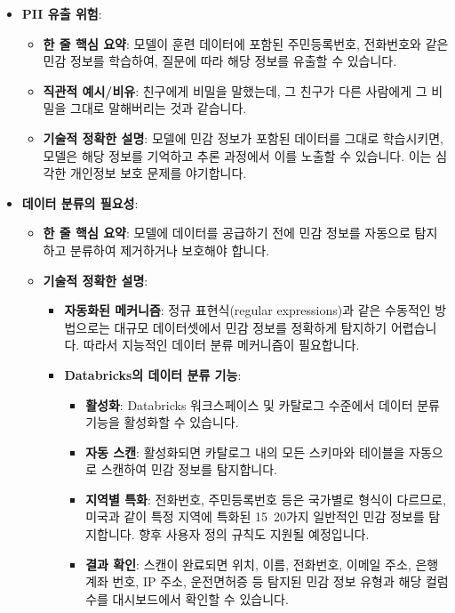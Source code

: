 \documentclass[11pt,a4paper]{article}
\theoremstyle{definition}
\begin{document}
\begin{itemize}
\begin{itemize}
\begin{itemize}
\begin{itemize}
    \item \textbf{PII 유출 위험}:
    \begin{itemize}
        \item \textbf{한 줄 핵심 요약}: 모델이 훈련 데이터에 포함된 주민등록번호, 전화번호와 같은 민감 정보를 학습하여, 질문에 따라 해당 정보를 유출할 수 있습니다.
        \item \textbf{직관적 예시/비유}: 친구에게 비밀을 말했는데, 그 친구가 다른 사람에게 그 비밀을 그대로 말해버리는 것과 같습니다.
        \item \textbf{기술적 정확한 설명}: 모델에 민감 정보가 포함된 데이터를 그대로 학습시키면, 모델은 해당 정보를 기억하고 추론 과정에서 이를 노출할 수 있습니다. 이는 심각한 개인정보 보호 문제를 야기합니다.
    \end{itemize}

    \item \textbf{데이터 분류의 필요성}:
    \begin{itemize}
        \item \textbf{한 줄 핵심 요약}: 모델에 데이터를 공급하기 전에 민감 정보를 자동으로 탐지하고 분류하여 제거하거나 보호해야 합니다.
        \item \textbf{기술적 정확한 설명}:
        \begin{itemize}
            \item \textbf{자동화된 메커니즘}: 정규 표현식(regular expressions)과 같은 수동적인 방법으로는 대규모 데이터셋에서 민감 정보를 정확하게 탐지하기 어렵습니다. 따라서 지능적인 데이터 분류 메커니즘이 필요합니다.
            \item \textbf{Databricks의 데이터 분류 기능}:
            \begin{itemize}
                \item \textbf{활성화}: Databricks 워크스페이스 및 카탈로그 수준에서 데이터 분류 기능을 활성화할 수 있습니다.
                \item \textbf{자동 스캔}: 활성화되면 카탈로그 내의 모든 스키마와 테이블을 자동으로 스캔하여 민감 정보를 탐지합니다.
                \item \textbf{지역별 특화}: 전화번호, 주민등록번호 등은 국가별로 형식이 다르므로, 미국과 같이 특정 지역에 특화된 15~20가지 일반적인 민감 정보를 탐지합니다. 향후 사용자 정의 규칙도 지원될 예정입니다.
                \item \textbf{결과 확인}: 스캔이 완료되면 위치, 이름, 전화번호, 이메일 주소, 은행 계좌 번호, IP 주소, 운전면허증 등 탐지된 민감 정보 유형과 해당 컬럼 수를 대시보드에서 확인할 수 있습니다.
            \end{itemize}
        \end{itemize}
    \end{itemize}


\end{itemize}
\end{itemize}
\end{itemize}
\end{itemize}
\end{document}

